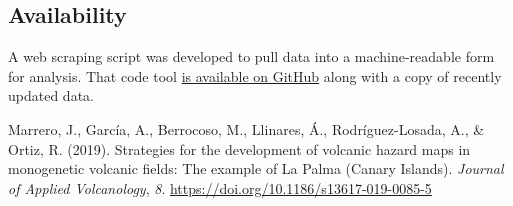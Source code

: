 \documentclass[
]{agujournal2019}
\newlength{\cslhangindent}
\newenvironment{CSLReferences}[2] %
 {\begin{list}{}{%
  \setlength{\itemindent}{0pt}
  \setlength{\leftmargin}{0pt}
  \setlength{\parsep}{0pt}
  \ifodd #1
   \setlength{\leftmargin}{\cslhangindent}
   \setlength{\itemindent}{-1\cslhangindent}
  \fi
  \setlength{\itemsep}{#2\baselineskip}}}
 {\end{list}}
\begin{document}
\subsection*{Availability}\label{availability}

A web scraping script was developed to pull data into a machine-readable
form for analysis. That code tool
\href{https://github.com/stevejpurves/ign-earthquake-data}{is available
on GitHub} along with a copy of recently updated data.

\label{refs}
\begin{CSLReferences}{1}{0}
Marrero, J., García, A., Berrocoso, M., Llinares, Á., Rodríguez-Losada,
A., \& Ortiz, R. (2019). Strategies for the development of volcanic
hazard maps in monogenetic volcanic fields: The example of {La} {Palma}
({Canary} {Islands}). \emph{Journal of Applied Volcanology}, \emph{8}.
\url{https://doi.org/10.1186/s13617-019-0085-5}

\end{CSLReferences}
\end{document}
